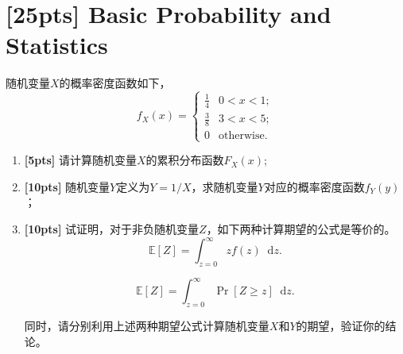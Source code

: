 \documentclass[a4paper,UTF8]{article}
\numberwithin{equation}{section}
\newcommand*\diff{\mathop{}\!\mathrm{d}}
\begin{document}
\newpage
\section{[25pts] Basic Probability and Statistics}
随机变量$X$的概率密度函数如下，
\begin{equation}
	f_X(x) = 
	\begin{cases}
		\frac{1}{4} & 0<x<1;\\
		\frac{3}{8} & 3<x<5;\\
		0			& \mbox{otherwise.}
	\end{cases}
\end{equation}
\begin{enumerate}[ {(}1{)}]
\item \textbf{[5pts]} 请计算随机变量$X$的累积分布函数$F_X(x)$;
\item \textbf{[10pts]} 随机变量$Y$定义为$Y = 1/X$，求随机变量$Y$对应的概率密度函数$f_Y(y)$；
\item \textbf{[10pts]} 试证明，对于非负随机变量$Z$，如下两种计算期望的公式是等价的。
\begin{equation}
	\label{eq-expect-1}
	\mathbb{E}[Z] = \int_{z=0}^{\infty}zf(z) \diff z.
\end{equation}

\begin{equation}
	\label{eq-expect-2}
	\mathbb{E}[Z] = \int_{z=0}^{\infty}\Pr[Z\geq z] \diff z.
\end{equation}

同时，请分别利用上述两种期望公式计算随机变量$X$和$Y$的期望，验证你的结论。
\end{enumerate}
\end{document}
